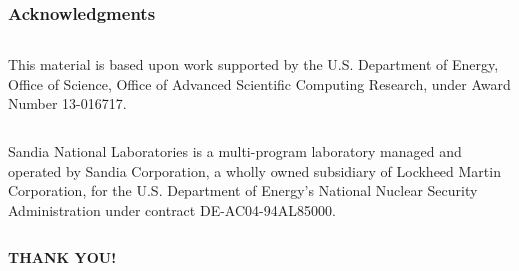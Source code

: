 
\begin{frame}
\frametitle{Acknowledgments}
%
\begin{columns}
\begin{column}{0.95\textwidth}
\centering
This material is based upon work supported by the 
U.S. Department of Energy, Office of Science, Office of 
Advanced Scientific Computing Research, 
under Award Number 13-016717.\par 
\end{column}
\end{columns}
%
\bbk
\mmk

\begin{columns}
\begin{column}{0.95\textwidth}
\centering
Sandia National Laboratories is a multi-program 
laboratory managed and operated by Sandia Corporation, 
a wholly owned subsidiary of Lockheed Martin Corporation, 
for the U.S. Department of Energy's 
National Nuclear Security Administration under contract 
DE-AC04-94AL85000.\par
\end{column}
\end{columns}
%
\bbk
\mmk

\pause
\begin{center}
{\Large \bf THANK YOU!}
\end{center}

\end{frame}
